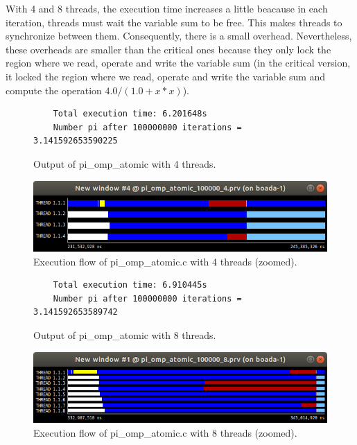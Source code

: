 \documentclass[12pt, a4paper]{article}
\begin{document}
With 4 and 8 threads, the execution time increases a little beacause in each iteration, threads must wait the variable sum to be free. This makes threads to synchronize between them. Consequently, there is a small overhead. Nevertheless, these overheads are smaller than the critical ones because they only lock the region where we read, operate and write the variable sum (in the critical version, it locked the region where we read, operate and write the variable sum and compute the operation $4.0/(1.0+x*x)$).

\begin{figure}[H]
	\begin{lstlisting}
	Total execution time: 6.201648s
	Number pi after 100000000 iterations = 3.141592653590225			
	\end{lstlisting}
	\caption{Output of pi\_omp\_atomic with 4 threads.}
	\label{piompatomic4}
\end{figure}

\begin{figure}[H]
  \centering
  \includegraphics[scale=0.5]{./images/pi_omp_atomic_4_zoom}
  \caption{Execution flow of pi\_omp\_atomic.c with 4 threads (zoomed).}
  \label{pi_omp_atomic_4_zoom}
\end{figure}

\begin{figure}[H]
	\begin{lstlisting}
	Total execution time: 6.910445s
	Number pi after 100000000 iterations = 3.141592653589742
	\end{lstlisting}
	\caption{Output of pi\_omp\_atomic with 8 threads.}
	\label{piompatomic8}
\end{figure}

\begin{figure}[H]
  \centering
  \includegraphics[scale=0.5]{./images/pi_omp_atomic_8_zoom}
  \caption{Execution flow of pi\_omp\_atomic.c with 8 threads (zoomed).}
  \label{pi_omp_atomic_8_zoom}
\end{figure}
\end{document}
